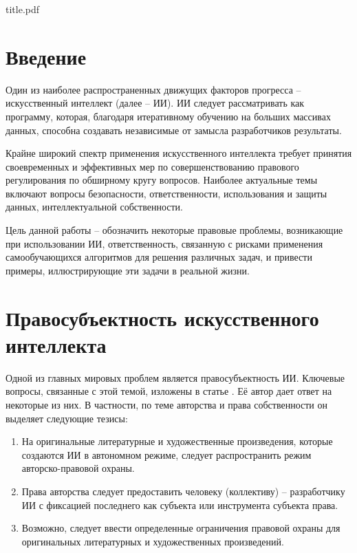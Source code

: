 

\def\oldbibitem{}
\let\oldbibitem=\bibitem
\def\bibitem{\stepcounter{citenum}\oldbibitem}



{title.pdf}

\tableofcontents
\newpage

\section{Введение}
Один из наиболее распространенных движущих факторов прогресса – искусственный
интеллект (далее – ИИ). ИИ следует рассматривать как программу, которая, благодаря
итеративному обучению на больших массивах данных, способна создавать независимые от
замысла разработчиков результаты.

Крайне широкий спектр применения искусственного интеллекта требует принятия
своевременных и эффективных мер по совершенствованию правового регулирования по
обширному кругу вопросов. Наиболее актуальные темы включают вопросы безопасности,
ответственности, использования и защиты данных, интеллектуальной собственности.

Цель данной работы -- обозначить некоторые правовые проблемы, возникающие при использовании ИИ,
ответственность, связанную с рисками применения самообучающихся алгоритмов для
решения различных задач, и привести примеры, иллюстрирующие эти задачи в реальной жизни.

\newpage
\section{Правосубъектность искусственного интеллекта}
Одной из главных мировых проблем является правосубъектность ИИ. Ключевые вопросы, связанные
с этой темой, изложены в статье \cite{II}. Её автор дает ответ на некоторые из них.
В частности, по теме авторства и права собственности он выделяет следующие тезисы:

\begin{enumerate}
\item На оригинальные литературные и художественные произведения, которые создаются ИИ в автономном режиме,
следует распространить режим авторско-правовой охраны.
\item Права авторства следует предоставить человеку (коллективу) – разработчику ИИ с фиксацией последнего как
субъекта или инструмента субъекта права.
\item Возможно, следует ввести определенные ограничения правовой охраны для оригинальных литературных и
художественных произведений.
\end{enumerate}

